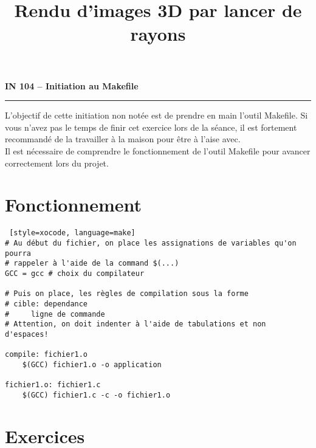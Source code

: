 \documentclass[10pt, a4paper ]{article}
\title{Rendu d'images 3D par lancer de rayons}
\begin{document}
\noindent
\textbf{\textsf{\large IN 104 -- Initiation au Makefile }}
\vskip1mm\hrule%


\begin{minipage}{.9\textwidth} \sf L'objectif de cette initiation non notée est
    de prendre en main l'outil Makefile. Si vous n'avez pas le temps de finir
    cet exercice lors de la séance, il est fortement recommandé de la travailler
    à la maison pour être à l'aise avec.\\ Il est nécessaire de comprendre le
    fonctionnement de l'outil Makefile pour avancer correctement lors du projet.
\end{minipage}


\section{Fonctionnement}

\begin{lstlisting} [style=xocode, language=make]
# Au début du fichier, on place les assignations de variables qu'on pourra
# rappeler à l'aide de la command $(...)
GCC = gcc # choix du compilateur

# Puis on place, les règles de compilation sous la forme
# cible: dependance
#     ligne de commande
# Attention, on doit indenter à l'aide de tabulations et non d'espaces!

compile: fichier1.o
    $(GCC) fichier1.o -o application

fichier1.o: fichier1.c
    $(GCC) fichier1.c -c -o fichier1.o
\end{lstlisting}

\section{Exercices}
\end{document}
